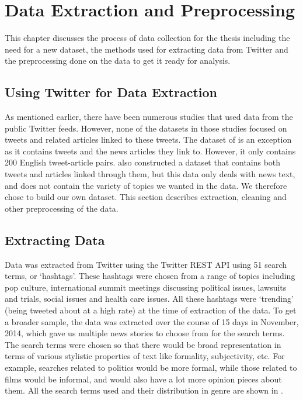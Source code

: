 \chapter{Data Extraction and Preprocessing}
\label{chap:data}

This chapter discusses the process of data collection for the thesis including the need for a new dataset, the methods used for extracting data from Twitter and the preprocessing done on the data to get it ready for analysis. 


\section{Using Twitter for Data Extraction}

As mentioned earlier, there have been numerous studies that used data from the public Twitter feeds. However, none of the datasets in those studies focused on tweets and related articles linked to these tweets. The dataset of \cite{lloret2013towards} is an exception as it contains tweets and the news articles they link to. However, it only contains 200 English tweet-article pairs. \cite{wei2014utilizing} also constructed a dataset that contains both tweets and articles linked through them, but this data only deals with news text, and does not contain the variety of topics we wanted in the data. We therefore chose to build our own dataset. This section describes extraction, cleaning and other preprocessing of the data.

\section{Extracting Data}

Data was extracted from Twitter using the Twitter REST API using 51 search terms, or ‘hashtags’. These hashtags were chosen from a range of topics including pop culture,  international summit meetings discussing political issues, lawsuits and trials, social issues and health care issues. All these hashtags were ‘trending’ (being tweeted about at a high rate) at the time of extraction of the data. To get a broader sample, the data was extracted over the course of 15 days in November, 2014, which gave us multiple news stories to choose from for the search terms. The search terms were chosen so that there would be broad representation in terms of various stylistic properties of text like formality, subjectivity, etc. For example, searches related to politics would be more formal, while those related to films would be informal, and would also have a lot more opinion pieces about them. All the search terms used and their distribution in genre are shown in .

